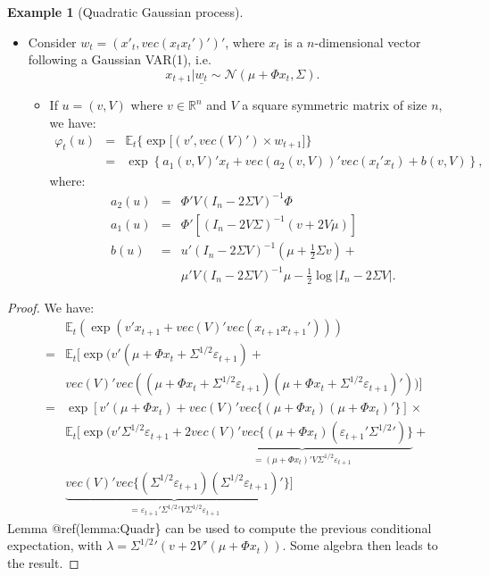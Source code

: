 \documentclass[
  12pt,
]{book}
\providecommand{\tightlist}{%
  \setlength{\itemsep}{0pt}\setlength{\parskip}{0pt}}
\theoremstyle{definition}
\theoremstyle{definition}
\newtheorem{example}{Example}[chapter]
\theoremstyle{definition}
\theoremstyle{definition}
\theoremstyle{remark}
\begin{document}
\begin{example}[Quadratic Gaussian process]
\protect\hypertarget{exm:QGVAR1}{}\label{exm:QGVAR1}\leavevmode

\begin{itemize}
\tightlist
\item
  Consider \(w_t = (x'_t,vec(x_t x_t')')'\), where \(x_t\) is a \(n\)-dimensional vector following a Gaussian VAR(1), i.e.
  \[
  x_{t+1}|\underline{w_t} \sim \mathcal{N}(\mu+\Phi x_t, \Sigma).
  \]

  \begin{itemize}
  \tightlist
  \item
    If \(u = (v,V)\) where \(v \in \mathbb{R}^n\) and \(V\) a square symmetric matrix of size \(n\), we have:
    \begin{eqnarray*}
      \varphi_t(u) &=& \mathbb{E}_t\big\{\exp\big[(v',vec(V)')\times w_{t+1}\big]\big\} \\
      & =& \exp \left\{a_1(v,V)'x_t +vec(a_2(v,V))' vec(x_t'x_t) + b(v,V) \right\},
      \end{eqnarray*}
    where:
    \begin{eqnarray*}\label{eq:laplaceZ}
          a_2(u) & = & \Phi'V (I_n - 2\Sigma V)^{-1} \Phi \nonumber \\
          a_1(u) & = & \Phi'\left[(I_n-2V\Sigma)^{-1}(v+2V\mu)\right] \nonumber \\
          b(u) & = & u'(I_n - 2 \Sigma V)^{-1}\left(\mu + \frac{1}{2} \Sigma v\right) +\\
          && \mu'V(I_n - 2 \Sigma V)^{-1}\mu - \frac{1}{2}\log\big|I_n - 2\Sigma V\big|.
      \end{eqnarray*}
  \end{itemize}
\end{itemize}

\end{example}

\begin{proof}
We have:
\begin{eqnarray*}
&&\mathbb{E}_t(\exp(v' x_{t+1} + vec(V)'vec(x_{t+1} x_{t+1}'))) \\
&=& \mathbb{E}_t[\exp(v' (\mu + \Phi x_t + \Sigma^{1/2}\varepsilon_{t+1}) + \\
&& vec(V)'vec((\mu + \Phi x_t + \Sigma^{1/2}\varepsilon_{t+1}) (\mu + \Phi x_t + \Sigma^{1/2}\varepsilon_{t+1})'))] \\
&=& \exp[v' (\mu + \Phi x_t) + vec(V)'vec\{(\mu + \Phi x_t)(\mu + \Phi x_t)'\}] \times \\
&& \mathbb{E}_t[\exp(v'\Sigma^{1/2}\varepsilon_{t+1} +2\underbrace{ vec(V)' vec\{(\mu + \Phi x_t)(\varepsilon_{t+1}'{\Sigma^{1/2}}')\}}_{=(\mu + \Phi x_t)'V\Sigma^{1/2}\varepsilon_{t+1}} +\\
&& \underbrace{vec(V)'vec\{(\Sigma^{1/2}\varepsilon_{t+1})(\Sigma^{1/2}\varepsilon_{t+1})'}_{=\varepsilon_{t+1}'{\Sigma^{1/2}}'V\Sigma^{1/2}\varepsilon_{t+1}}\}]
\end{eqnarray*}
Lemma @ref(lemma:Quadr\} can be used to compute the previous conditional expectation, with \(\lambda = {\Sigma^{1/2}}'(v + 2 V'(\mu + \Phi x_t))\). Some algebra then leads to the result.
\end{proof}
\end{document}
